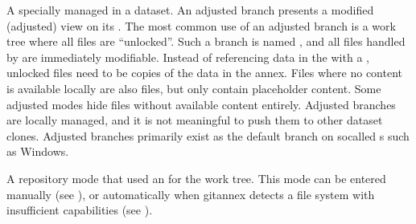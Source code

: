 \begin{description}
\ignorespaces 
\sphinxAtStartPar
A specially managed {\hyperref[\detokenize{glossary:term-branch}]{}} in a dataset.
An adjusted branch presents a modified (adjusted) view on its
{\hyperref[\detokenize{glossary:term-corresponding-branch}]{}}. The most common use of an adjusted branch
is a work tree where all files are “unlocked”.
Such a branch is named , and
all files handled by {\hyperref[\detokenize{glossary:term-git-annex}]{}} are immediately modifiable.
Instead of referencing data in the {\hyperref[\detokenize{glossary:term-annex}]{}} with a {\hyperref[\detokenize{glossary:term-symlink}]{}},
unlocked files need to be copies of the data in the annex.
Files where no content is available locally are also files, but only
contain placeholder content. Some adjusted modes hide files without
available content entirely.
Adjusted branches are locally managed, and it is not meaningful to push
them to other dataset clones.
Adjusted branches primarily exist as the default branch on so\sphinxhyphen{}called
{\hyperref[\detokenize{glossary:term-crippled-file-system}]{}}s such as Windows.

\ignorespaces 
\sphinxAtStartPar
A repository mode that used an {\hyperref[\detokenize{glossary:term-adjusted-branch}]{}} for the work tree.
This mode can be entered manually (see ), or automatically
when git\sphinxhyphen{}annex detects a file system with insufficient capabilities
(see {\hyperref[\detokenize{glossary:term-crippled-file-system}]{}}).


\end{description}
